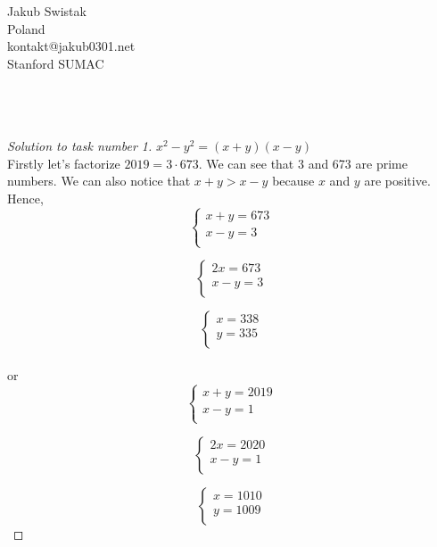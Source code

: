 \documentclass[12pt,a4paper]{article}
\begin{document}
\newtheorem{fakt}{Fakt}
\begin{flushleft}
Jakub Swistak\\
Poland \\
kontakt@jakub0301.net\\
Stanford SUMAC \\

\end{flushleft}\


\section*{}



\begin{proof}[Solution to task number 1]

$x^2-y^2=(x+y)(x-y)$\\
Firstly let's factorize $2019=3 \cdot 673$. We can see that 3 and 673 are prime numbers. We can also notice that $x+y>x-y$ because $x$ and $y$ are positive. Hence,
$$\left\{\begin{array}{rcl}
x+y=673\\
x-y=3\\
\end{array} \right.$$

$$\left\{\begin{array}{rcl}
2x=673\\
x-y=3\\
\end{array} \right.$$

$$\left\{\begin{array}{rcl}
x=338\\
y=335\\
\end{array} \right.$$\\
or 
$$\left\{\begin{array}{rcl}
x+y=2019\\
x-y=1\\
\end{array} \right.$$

$$\left\{\begin{array}{rcl}
2x=2020\\
x-y=1\\
\end{array} \right.$$

$$\left\{\begin{array}{rcl}
x=1010\\
y=1009\\
\end{array} \right.$$


\end{proof}
\end{document}
